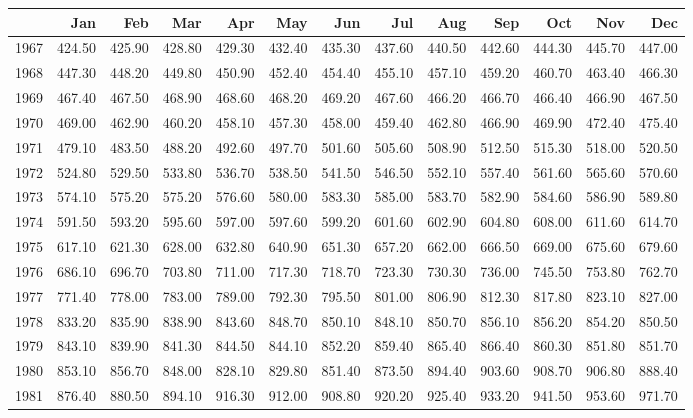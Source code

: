 \begin{longtable}{rrrrrrrrrrrrr}
  \hline
 & Jan & Feb & Mar & Apr & May & Jun & Jul & Aug & Sep & Oct & Nov & Dec \\ 
  \hline
1967 & 424.50 & 425.90 & 428.80 & 429.30 & 432.40 & 435.30 & 437.60 & 440.50 & 442.60 & 444.30 & 445.70 & 447.00 \\ 
  1968 & 447.30 & 448.20 & 449.80 & 450.90 & 452.40 & 454.40 & 455.10 & 457.10 & 459.20 & 460.70 & 463.40 & 466.30 \\ 
  1969 & 467.40 & 467.50 & 468.90 & 468.60 & 468.20 & 469.20 & 467.60 & 466.20 & 466.70 & 466.40 & 466.90 & 467.50 \\ 
  1970 & 469.00 & 462.90 & 460.20 & 458.10 & 457.30 & 458.00 & 459.40 & 462.80 & 466.90 & 469.90 & 472.40 & 475.40 \\ 
  1971 & 479.10 & 483.50 & 488.20 & 492.60 & 497.70 & 501.60 & 505.60 & 508.90 & 512.50 & 515.30 & 518.00 & 520.50 \\ 
  1972 & 524.80 & 529.50 & 533.80 & 536.70 & 538.50 & 541.50 & 546.50 & 552.10 & 557.40 & 561.60 & 565.60 & 570.60 \\ 
  1973 & 574.10 & 575.20 & 575.20 & 576.60 & 580.00 & 583.30 & 585.00 & 583.70 & 582.90 & 584.60 & 586.90 & 589.80 \\ 
  1974 & 591.50 & 593.20 & 595.60 & 597.00 & 597.60 & 599.20 & 601.60 & 602.90 & 604.80 & 608.00 & 611.60 & 614.70 \\ 
  1975 & 617.10 & 621.30 & 628.00 & 632.80 & 640.90 & 651.30 & 657.20 & 662.00 & 666.50 & 669.00 & 675.60 & 679.60 \\ 
  1976 & 686.10 & 696.70 & 703.80 & 711.00 & 717.30 & 718.70 & 723.30 & 730.30 & 736.00 & 745.50 & 753.80 & 762.70 \\ 
  1977 & 771.40 & 778.00 & 783.00 & 789.00 & 792.30 & 795.50 & 801.00 & 806.90 & 812.30 & 817.80 & 823.10 & 827.00 \\ 
  1978 & 833.20 & 835.90 & 838.90 & 843.60 & 848.70 & 850.10 & 848.10 & 850.70 & 856.10 & 856.20 & 854.20 & 850.50 \\ 
  1979 & 843.10 & 839.90 & 841.30 & 844.50 & 844.10 & 852.20 & 859.40 & 865.40 & 866.40 & 860.30 & 851.80 & 851.70 \\ 
  1980 & 853.10 & 856.70 & 848.00 & 828.10 & 829.80 & 851.40 & 873.50 & 894.40 & 903.60 & 908.70 & 906.80 & 888.40 \\ 
  1981 & 876.40 & 880.50 & 894.10 & 916.30 & 912.00 & 908.80 & 920.20 & 925.40 & 933.20 & 941.50 & 953.60 & 971.70 \\ 

\end{longtable}
